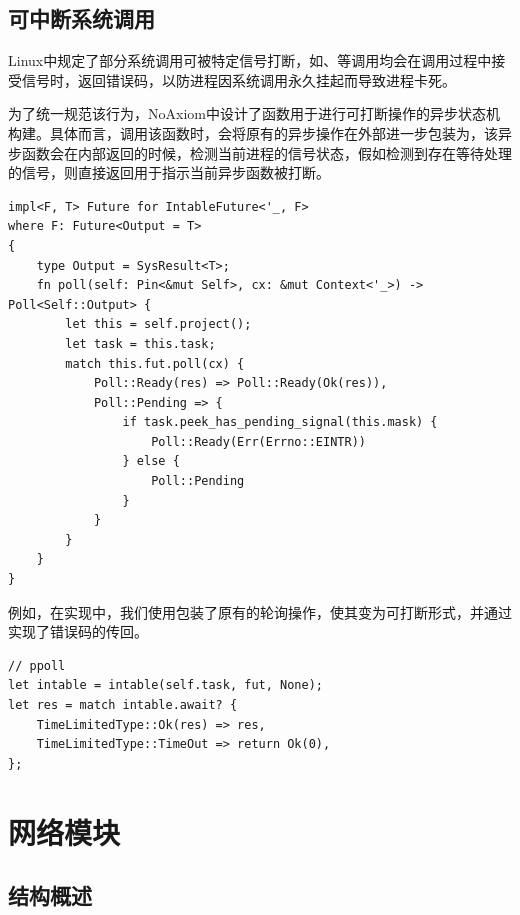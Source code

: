 \documentclass{article}
\begin{document}
\subsection{可中断系统调用}

Linux中规定了部分系统调用可被特定信号打断，如、等调用均会在调用过程中接受信号时，返回错误码，以防进程因系统调用永久挂起而导致进程卡死。

为了统一规范该行为，NoAxiom中设计了函数用于进行可打断操作的异步状态机构建。具体而言，调用该函数时，会将原有的异步操作在外部进一步包装为，该异步函数会在内部返回的时候，检测当前进程的信号状态，假如检测到存在等待处理的信号，则直接返回用于指示当前异步函数被打断。

\begin{lstlisting}
impl<F, T> Future for IntableFuture<'_, F>
where F: Future<Output = T>
{
    type Output = SysResult<T>;
    fn poll(self: Pin<&mut Self>, cx: &mut Context<'_>) -> Poll<Self::Output> {
        let this = self.project();
        let task = this.task;
        match this.fut.poll(cx) {
            Poll::Ready(res) => Poll::Ready(Ok(res)),
            Poll::Pending => {
                if task.peek_has_pending_signal(this.mask) {
                    Poll::Ready(Err(Errno::EINTR))
                } else {
                    Poll::Pending
                }
            }
        }
    }
}
\end{lstlisting}

例如，在实现中，我们使用包装了原有的轮询操作，使其变为可打断形式，并通过实现了错误码的传回。

\begin{lstlisting}
// ppoll
let intable = intable(self.task, fut, None);
let res = match intable.await? {
    TimeLimitedType::Ok(res) => res,
    TimeLimitedType::TimeOut => return Ok(0),
};
\end{lstlisting}


\newpage
\section{网络模块}

\subsection{结构概述}
\end{document}
